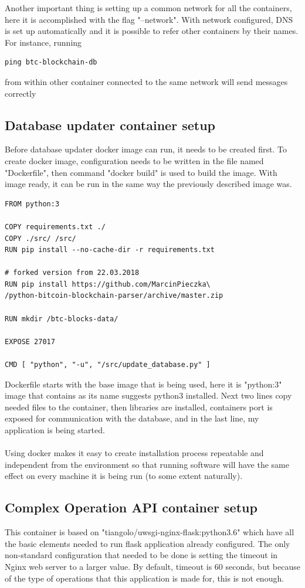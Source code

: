 \documentclass[12pt, en, eng, twoside, final]{mgr}
\begin{document}
Another important thing is setting up a common network for all the containers, here it is accomplished with the flag "--network". With network configured, DNS is set up automatically and it is possible to refer other containers by their names. For instance, running 
\begin{verbatim}
ping btc-blockchain-db
\end{verbatim}  
from within other container connected to the same network will send messages correctly

\subsection{Database updater container setup}
Before database updater docker image can run, it needs to be created first. To create docker image, configuration needs to be written in the file named "Dockerfile", then command "docker build" is used to build the image. With image ready, it can be run in the same way the previously described image was.

\begin{lstlisting}[caption=The dockerfile for database updater]
FROM python:3

COPY requirements.txt ./
COPY ./src/ /src/
RUN pip install --no-cache-dir -r requirements.txt

# forked version from 22.03.2018
RUN pip install https://github.com/MarcinPieczka\
/python-bitcoin-blockchain-parser/archive/master.zip

RUN mkdir /btc-blocks-data/

EXPOSE 27017

CMD [ "python", "-u", "/src/update_database.py" ]
\end{lstlisting}

Dockerfile starts with the base image that is being used, here it is "python:3" \cite{python3} image that contains as its name suggests python3 installed.
Next two lines copy needed files to the container, then libraries are installed, containers port is exposed for communication with the database, and in the last line, my application is being started.
\\
\\
Using docker makes it easy to create installation process repeatable and independent from the environment so that running software will have the same effect on every machine it is being run (to some extent naturally). 

\subsection{Complex Operation API container setup}
This container is based on "tiangolo/uwsgi-nginx-flask:python3.6" \cite{flask} which have all the basic elements needed to run flask application already configured. The only non-standard configuration that needed to be done is setting the timeout in Nginx \cite{nginx} web server to a larger value. By default, timeout is 60 seconds, but because of the type of operations that this application is made for, this is not enough.  
\end{document}
